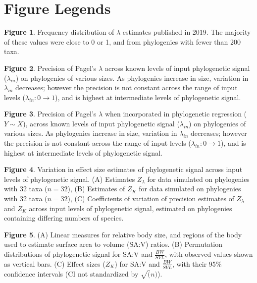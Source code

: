 \documentclass[
]{article}
\begin{document}
\newpage

\hypertarget{figure-legends}{%
\section{Figure Legends}\label{figure-legends}}

\textbf{Figure 1}. Frequency distribution of \(\lambda\) estimates
published in 2019. The majority of these values were close to 0 or 1,
and from phylogenies with fewer than 200 taxa. \hfill\break

\textbf{Figure 2}. Precision of Pagel's \(\lambda\) across known levels
of input phylogenetic signal (\(\lambda_{in}\)) on phylogenies of
various sizes. As phylogenies increase in size, variation in
\(\lambda_{in}\) decreases; however the precision is not constant across
the range of input levels (\(\lambda_{in}: 0 \to 1\)), and is highest at
intermediate levels of phylogenetic signal. \hfill\break

\textbf{Figure 3}. Precision of Pagel's \(\lambda\) when incorporated in
phylogenetic regression (\(Y\sim X\)), across known levels of input
phylogenetic signal (\(\lambda_{in}\)) on phylogenies of various sizes.
As phylogenies increase in size, variation in \(\lambda_{in}\)
decreases; however the precision is not constant across the range of
input levels (\(\lambda_{in}: 0 \to 1\)), and is highest at intermediate
levels of phylogenetic signal. \hfill\break

\textbf{Figure 4}. Variation in effect size estimates of phylogenetic
signal across input levels of phylogenetic signal. (A) Estimates
\(Z_\lambda\) for data simulated on phylogenies with 32 taxa (\(n=32\)),
(B) Estimates of \(Z_K\) for data simulated on phylogenies with 32 taxa
(\(n=32\)), (C) Coefficients of variation of precision estimates of
\(Z_\lambda\) and \(Z_K\) across input levels of phylogenetic signal,
estimated on phylogenies containing differing numbers of species.

\textbf{Figure 5}. (A) Linear measures for relative body size, and
regions of the body used to estimate surface area to volume (SA:V)
ratios. (B) Permutation distributions of phylogenetic signal for SA:V
and \(\frac{BW}{SVL}\), with observed values shown as vertical bars. (C)
Effect sizes (\(Z_K\)) for SA:V and \(\frac{BW}{SVL}\), with their 95\%
confidence intervals (CI not standardized by \(\sqrt(n)\)).

\newpage
\end{document}
